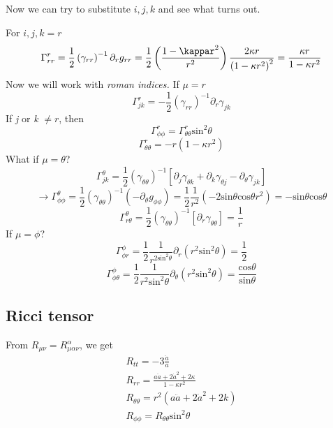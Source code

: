 Now we can try to substitute $i,j,k$ and see what turns out.\par
For $i,j,k = r$
\[
\Gamma ^{r}_{rr} = \frac{1}{2} \left( \gamma _{rr} \right)^{-1} \partial_{r}g_{rr} = \frac{1}{2} \left( \frac{1-\kappar^{2} }{r^{2}} \right) \frac{2\kappa r}{\left( 1-\kappa r^{2} \right)^{2}} = \frac{\kappa r}{1- \kappa r^{2}}
\]
Now we will work with \emph{roman indices.} If $\mu  = r$
\[
\Gamma ^{r}_{jk} = -\frac{1}{2}\left( \gamma _{rr} \right)^{-1}\partial_{r}\gamma_{jk}
\]
If \emph{j} or \emph{k} $\neq r$, then
\[
\Gamma ^{r}_{\phi \phi } = \Gamma ^{r}_{\theta \theta }\text{sin}^{2}\theta 
\]
\[
\Gamma ^{r}_{\theta \theta } = -r\left( 1-\kappa r^{2} \right)
\]
What if $\mu = \theta $?
\[
	\Gamma ^{\theta }_{jk} = \frac{1}{2}\left( \gamma _{\theta \theta } \right)^{-1}\left[ \partial_{j}\gamma _{\theta k} + \partial_{k}\gamma _{\theta j}- \partial_{\theta }\gamma _{jk} \right]
\]
\[
\to  \Gamma ^{\theta }_{\phi \phi } = \frac{1}{2} \left( \gamma _{\theta \theta } \right)^{-1} \left( -\partial_{\theta }g_{\phi \phi } \right) = \frac{1}{2}\frac{1}{r^{2}}\left( -2\text{sin}\theta \text{cos}\theta r^{2} \right) = -\text{sin}\theta \text{cos}\theta 
\]
\[
\Gamma ^{\theta }_{r \theta } = \frac{1}{2} \left( \gamma _{\theta \theta } \right)^{-1}\left[ \partial_{r}\gamma _{\theta \theta } \right] = \frac{1}{r}
\]
If $\mu  = \phi $?
\[
\Gamma ^{\phi }_{\phi r} = \frac{1}{2} \frac{1}{r^{2\text{sin}^{2}\theta }}\partial_{r}\left( r^{2}\text{sin}^{2}\theta  \right) = \frac{1}{2}
\]
\[
\Gamma ^{\phi }_{\phi \theta } = \frac{1}{2} \frac{1}{r^{2}\text{sin}^{2}\theta }\partial_{\theta }\left( r^{2}\text{sin}^{2}\theta  \right) = \frac{\text{cos}\theta }{\text{sin}\theta }
\]
\subsection{Ricci tensor}
From $R_{\mu \nu } = R^{\alpha }_{\mu \alpha \nu }$, we get
\begin{gather*}
R_{tt } = - 3 \frac{\ddot{a}}{a} \\
R_{rr} = \frac{a \ddot{a} + 2 \dot{a}^{2} +2\kappa }{1-\kappa r^{2}}\\
R_{\theta \theta } = r^{2} \left( a \ddot{a} + 2\dot{a}^{2}+2k \right)\\
R_{\phi \phi } = R_{\theta \theta }\text{sin}^{2}\theta 
\end{gather*}









